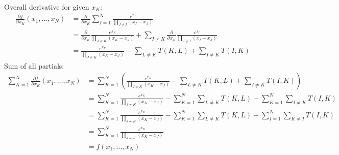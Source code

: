 \documentclass{article}
\begin{document}
Overall derivative for given $x_K$:
\begin{align*}
  \frac{\partial f}{\partial x_K}(x_1, \ldots, x_N)
  &= \frac{\partial}{\partial x_K} \sum_{I=1}^N \frac{e^{x_I}}{\prod\limits_{J \neq I}(x_I-x_J)} \\
  &= \frac{\partial}{\partial x_K} \frac{e^{x_K}}{\prod\limits_{J \neq K}(x_K-x_J)} + \sum_{I \neq K} \frac{\partial}{\partial x_K} \frac{e^{x_I}}{\prod\limits_{J \neq I}(x_I-x_J)} \\
  &= \frac{e^{x_K}}{\prod\limits_{J \neq K}(x_K-x_J)}-\sum\limits_{L \neq K}T(K, L)+\sum_{I \neq K}T(I, K)
\end{align*}
Sum of all partials:
\begin{align*}
  \sum_{K=1}^N\frac{\partial f}{\partial x_K}(x_1, \ldots, x_N)
  &= \sum_{K=1}^N\left(\frac{e^{x_K}}{\prod\limits_{J \neq K}(x_K-x_J)}-\sum\limits_{L \neq K}T(K, L)+\sum_{I \neq K}T(I, K)\right) \\
  &= \sum_{K=1}^N\frac{e^{x_K}}{\prod\limits_{J \neq K}(x_K-x_J)}-\sum_{K=1}^N\sum\limits_{L \neq K}T(K, L)+\sum_{K=1}^N\sum_{I \neq K}T(I, K) \\
  &= \sum_{K=1}^N\frac{e^{x_K}}{\prod\limits_{J \neq K}(x_K-x_J)}-\sum_{K=1}^N\sum\limits_{L \neq K}T(K, L)+\sum_{I=1}^N\sum_{K \neq I}T(I, K) \\
  &= \sum_{K=1}^N\frac{e^{x_K}}{\prod\limits_{J \neq K}(x_K-x_J)} \\
  &= f(x_1, \ldots, x_N)
\end{align*}
\end{document}
